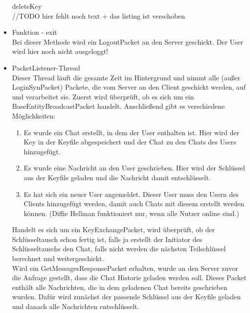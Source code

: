 \begin{itemize}
    deleteKey\\
    //TODO hier fehlt noch text + das listing ist verschoben
    
    \item Funktion - exit \\
    Bei dieser Methode wird ein LogoutPacket an den Server geschickt. Der User wird hier noch nicht ausgeloggt!
    
    \item PacketListener-Thread \\
    Dieser Thread läuft die gesamte Zeit im Hintergrund und nimmt alle (außer LoginSynPacket) Packete, die vom Server
    an den Client geschickt werden, auf und verarbeitet sie.
    Zuerst wird überprüft, ob es sich um ein BaseEntityBroadcastPacket handelt. Anschließend gibt es verschiedene Möglichkeiten: \\
    \begin{enumerate}
        \item Es wurde ein Chat erstellt, in dem der User enthalten ist. Hier wird der Key in der Keyfile abgespeichert
        und der Chat zu den Chats des Users hinzugefügt.
        \item Es wurde eine Nachricht an den User geschrieben. Hier wird der Schlüssel aus der Keyfile geladen und die
        Nachricht damit entschlüsselt.
        \item Es hat sich ein neuer User angemeldet. Dieser User muss den Usern des Clients hinzugefügt werden, damit auch
        Chats mit diesem erstellt werden können. (Diffie Hellman funktioniert nur, wenn alle Nutzer online sind.)
    \end{enumerate}
    
    Handelt es sich um ein KeyExchangePacket, wird überprüft, ob der Schlüsseltausch schon fertig ist,
    falls ja erstellt der Initiator des Schlüsseltauschs den Chat, falls nicht werden die nächsten
    Teilschlüssel berechnet und weitergeschickt.\\
    
    Wird ein GetMessagesResponsePacket erhalten, wurde an den Server zuvor die Anfrage gestellt, dass die Chat Historie
    geladen werden soll. Dieses Packet enthält alle Nachrichten, die in dem geladenen Chat bereits geschrieben wurden.
    Dafür wird zunächst der passende Schlüssel aus der Keyfile geladen und danach alle Nachrichten entschlüsselt.

\end{itemize}
